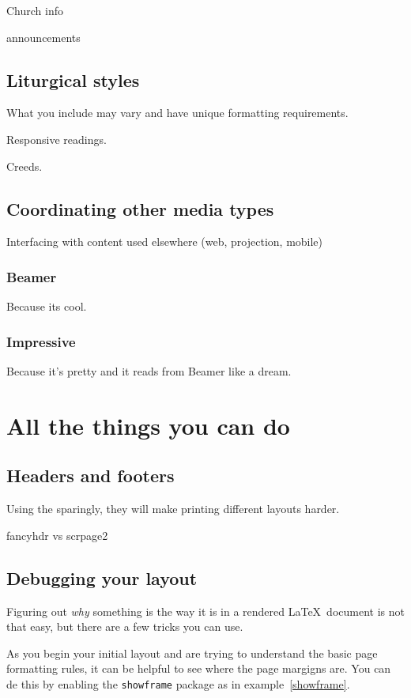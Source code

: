 \documentclass[12pt]{scrartcl}
\begin{document}
Church info

announcements

\subsection{Liturgical styles}

What you include may vary and have unique formatting requirements.

Responsive readings.

Creeds.

\subsection{Coordinating other media types}

Interfacing with content used elsewhere (web, projection, mobile)

\subsubsection{Beamer}

Because its cool.

\subsubsection{Impressive}
Because it's pretty and it reads from Beamer like a dream.

\section{All the things you can do}

\subsection{Headers and footers}

Using the sparingly, they will make printing different layouts harder.

fancyhdr vs scrpage2

\subsection{Debugging your layout}

Figuring out \emph{why} something is the way it is in a rendered \LaTeX~document
is not that easy, but there are a few tricks you can use.

\index{\verb+\usepackage{showframe}+}
As you begin your initial layout and are trying to understand the basic page
formatting  rules, it can be helpful to see where the page margigns are. You can
de this by enabling the \texttt{showframe} package as in
example~\vref{showframe}.
\end{document}
